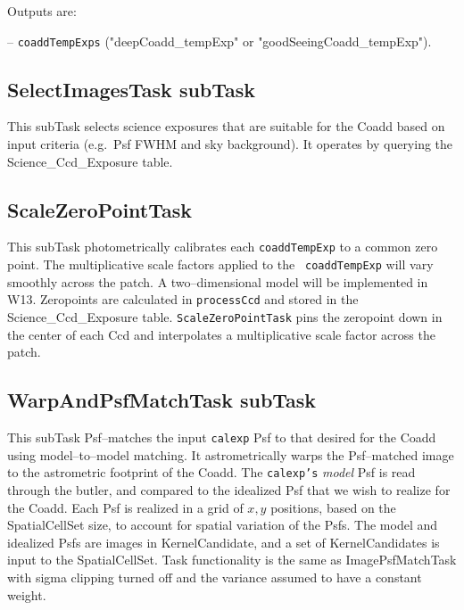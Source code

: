 \documentclass[prd, nofootinbib, floatfix, 11pt,tightenlines,times]{article}
\begin{document}
Outputs are:

-- {\tt coaddTempExps} ("deepCoadd\_tempExp" or "goodSeeingCoadd\_tempExp").

\subsection{SelectImagesTask subTask} 

This subTask selects science exposures that are suitable for the Coadd
based on input criteria (e.g.\ Psf FWHM and sky background). It operates by
querying the Science\_Ccd\_Exposure table.

\subsection{ScaleZeroPointTask} 

This subTask photometrically calibrates each {\tt coaddTempExp} to a
common zero point.  The multiplicative scale factors applied to the {\tt
  coaddTempExp} will vary smoothly across the patch. A two--dimensional
model will be implemented in W13.  Zeropoints are 
calculated in {\tt processCcd} and stored in the
Science\_Ccd\_Exposure table. {\tt ScaleZeroPointTask} pins the
zeropoint down in the center of each Ccd and interpolates a
multiplicative scale factor across the patch.


\subsection{WarpAndPsfMatchTask subTask} 

This subTask Psf--matches the input {\tt calexp} Psf to that desired
for the Coadd using model--to--model matching.
%
It astrometrically warps the Psf--matched image to the astrometric
footprint of the Coadd.  The {\tt calexp's} {\it model} Psf is read
through the butler, and compared to the idealized Psf that we wish to
realize for the Coadd.  Each Psf is realized in a grid of $x,y$
%
positions, based on the SpatialCellSet size, to account for spatial variation of the Psfs.  The model and
idealized Psfs are images in KernelCandidate, and a set of KernelCandidates is input to the
SpatialCellSet. Task functionality is the same as ImagePsfMatchTask with
sigma clipping turned off and the variance 
assumed to have a constant weight.
\end{document}
